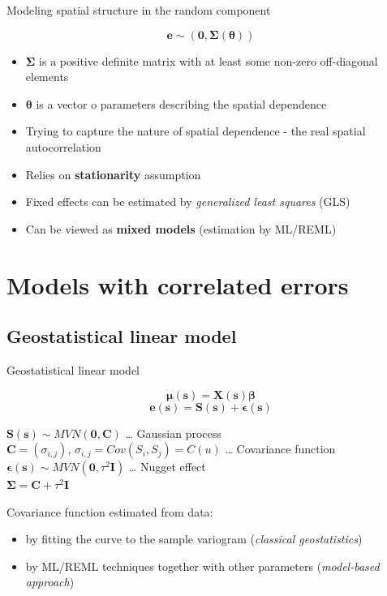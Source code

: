 \documentclass[
  ignorenonframetext,
]{beamer}
\providecommand{\tightlist}{%
  \setlength{\itemsep}{0pt}\setlength{\parskip}{0pt}}
\begin{document}
\begin{frame}{Modeling spatial structure in the random component}
\small

\[\boldsymbol{e} \sim (\boldsymbol{0}, \boldsymbol{\Sigma}(\boldsymbol{\theta}))\]

\begin{itemize}
\tightlist
\item
  \(\boldsymbol{\Sigma}\) is a positive definite matrix with at least
  some non-zero off-diagonal elements
\item
  \(\boldsymbol{\theta}\) is a vector o parameters describing the
  spatial dependence
\item
  Trying to capture the nature of spatial dependence - the real spatial
  autocorrelation
\item
  Relies on \textbf{stationarity} assumption
\item
  Fixed effects can be estimated by \emph{generalized least squares}
  (GLS)
\item
  Can be viewed as \textbf{mixed models} (estimation by ML/REML)
\end{itemize}
\end{frame}

\hypertarget{models-with-correlated-errors}{%
\section{Models with correlated
errors}\label{models-with-correlated-errors}}

\hypertarget{geostatistical-linear-model}{%
\subsection{Geostatistical linear
model}\label{geostatistical-linear-model}}

\begin{frame}{Geostatistical linear model}
\small

\[\boldsymbol{\mu}(\boldsymbol{s}) = \boldsymbol{X}(\boldsymbol{s})\boldsymbol{\beta}\]
\[\boldsymbol{e}(\boldsymbol{s}) = \boldsymbol{S}(\boldsymbol{s})+\boldsymbol{\epsilon}(\boldsymbol{s})\]

\(\boldsymbol{S}(\boldsymbol{s})\sim MVN(\boldsymbol{0}, \boldsymbol{C})\)
\ldots{} Gaussian process\\
\(\boldsymbol{C} = (\sigma_{i,j})\),
\(\sigma_{i,j} = Cov(S_i, S_j) = C(u)\) \ldots{} Covariance function\\
\(\boldsymbol{\epsilon}(\boldsymbol{s}) \sim MVN(\boldsymbol{0}, \tau^2\boldsymbol{I})\)
\ldots{} Nugget effect\\
\(\boldsymbol{\Sigma} = \boldsymbol{C}+\tau^2\boldsymbol{I}\)

Covariance function estimated from data:

\begin{itemize}
\tightlist
\item
  by fitting the curve to the sample variogram (\emph{classical
  geostatistics})
\item
  by ML/REML techniques together with other parameters
  (\emph{model-based approach})
\end{itemize}
\end{frame}
\end{document}
